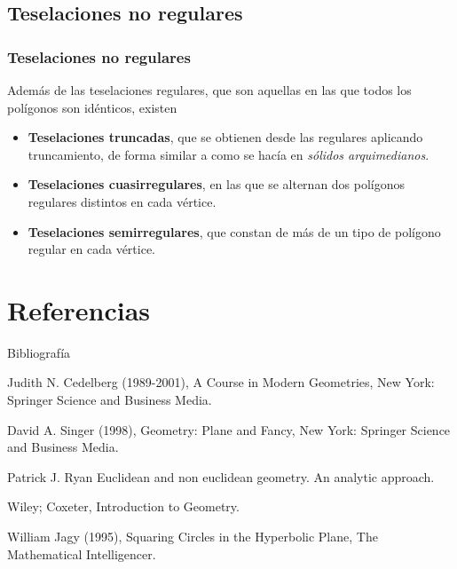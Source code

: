 \documentclass[compress]{beamer}
\begin{document}
\subsection{Teselaciones no regulares}
\begin{frame}
  \subsubsection{Teselaciones no regulares}
  Además de las teselaciones regulares, que son aquellas en las que
  todos los polígonos son idénticos, existen

  \begin{itemize}
  \item \textbf{Teselaciones truncadas}, que se obtienen desde las
    regulares aplicando truncamiento, de forma similar a como se hacía
    en \textit{sólidos arquimedianos}.
    \pause
  \item \textbf{Teselaciones cuasirregulares}, en las que se alternan
    dos polígonos regulares distintos en cada vértice.
    \pause
  \item \textbf{Teselaciones semirregulares}, que constan de más de un
    tipo de polígono regular en cada vértice.
  \end{itemize}
\end{frame}


\section{Referencias}
\begin{frame}{Bibliografía}
\begin{thebibliography}{9}

  Judith N. Cedelberg (1989-2001),
  A Course in Modern Geometries,
  New York: Springer Science and Business Media.

  David A. Singer (1998),
  Geometry: Plane and Fancy,
  New York: Springer Science and Business Media.

  Patrick J. Ryan
  Euclidean and non euclidean geometry. An analytic approach.

  Wiley; Coxeter,
  Introduction to Geometry.

  William Jagy (1995),
  Squaring Circles in the Hyperbolic Plane,
  The Mathematical Intelligencer.
  
\end{thebibliography}
\end{frame}
\end{document}
